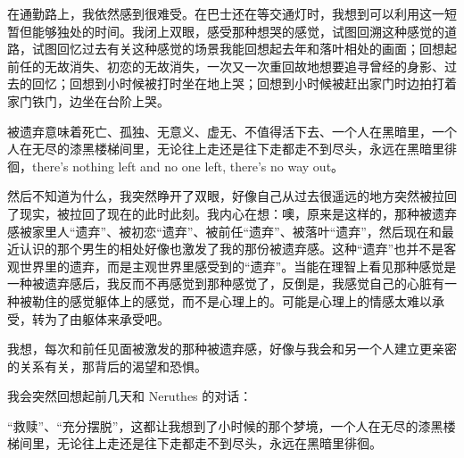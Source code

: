 在通勤路上，我依然感到很难受。在巴士还在等交通灯时，我想到可以利用这一短暂但能够独处的时间。我闭上双眼，感受那种想哭的感觉，试图回溯这种感觉的道路，试图回忆过去有关这种感觉的场景\pozhehao{}我能回想起去年和落叶相处的画面；回想起前任的无故消失、初恋的无故消失，一次又一次重回故地想要追寻曾经的身影、过去的回忆；回想到小时候被打时坐在地上哭；回想到小时候被赶出家门时边拍打着家门铁门，边坐在台阶上哭。

被遗弃意味着死亡、孤独、无意义、虚无、不值得活下去、一个人在黑暗里，一个人在无尽的漆黑楼梯间里，无论往上走还是往下走都走不到尽头，永远在黑暗里徘徊，there's nothing left and no one left, there's no way out。

然后不知道为什么，我突然睁开了双眼，好像自己从过去很遥远的地方突然被拉回了现实，被拉回了现在的此时此刻。我内心在想：噢，原来是这样的，那种被遗弃感\pozhehao{}被家里人“遗弃”、被初恋“遗弃”、被前任“遗弃”、被落叶“遗弃”，然后现在和最近认识的那个男生的相处好像也激发了我的那份被遗弃感。这种“遗弃”也并不是客观世界里的遗弃，而是主观世界里感受到的“遗弃”。当能在理智上看见那种感觉是一种被遗弃感后，我反而不再感觉到那种感觉了，反倒是，我感觉自己的心脏有一种被勒住的感觉\pozhehao{}躯体上的感觉，而不是心理上的。可能是心理上的情感太难以承受，转为了由躯体来承受吧。

我想，每次和前任见面被激发的那种被遗弃感，好像与我会和另一个人建立更亲密的关系有关，那背后的渴望和恐惧。

\tristarsepline

我会突然回想起前几天和 Neruthes 的对话：


“救赎”、“充分摆脱”，这都让我想到了小时候的那个梦境，一个人在无尽的漆黑楼梯间里，无论往上走还是往下走都走不到尽头，永远在黑暗里徘徊。

\tristarsepline

